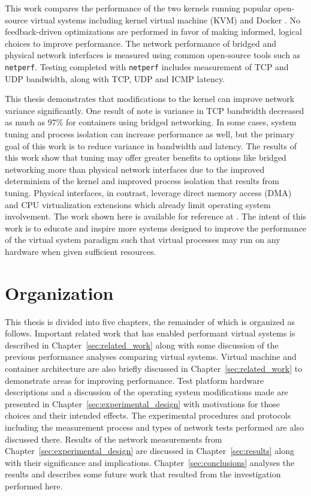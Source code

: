 This work compares the performance of the two kernels running popular open-source virtual systems including kernel virtual machine (KVM) and Docker \autocite{dockerdotcom}.
No feedback-driven optimizations are performed in favor of making informed, logical choices to improve performance.
The network performance of bridged and physical network interfaces is measured using common open-source tools such as \texttt{netperf}.
Testing completed with \texttt{netperf} includes measurement of TCP and UDP bandwidth, along with TCP, UDP and ICMP latency.

This thesis demonstrates that modifications to the kernel can improve network variance significantly.  
One result of note is variance in TCP bandwidth decreased as much as 97\% for containers using bridged networking.
In some cases, system tuning and process isolation can increase performance as well, but the primary goal of this work is to reduce variance in bandwidth and latency.
The results of this work show that tuning may offer greater benefits to options like bridged networking more than physical network interfaces due to the improved determinism of the kernel and improved process isolation that results from tuning.
Physical interfaces, in contrast, leverage direct memory access (DMA) and CPU virtualization extensions which already limit operating system involvement. 
The work shown here is available for reference at .
The intent of this work is to educate and inspire more systems designed to improve the performance of the virtual system paradigm such that virtual processes may run on any hardware when given sufficient resources.  

\section{Organization} %
\label{sec:introorganization}

This thesis is divided into five chapters, the remainder of which is organized as follows.
Important related work that has enabled performant virtual systems is described in Chapter~\ref{sec:related_work} along with some discussion of the previous performance analyses comparing virtual systems.
Virtual machine and container architecture are also briefly discussed in Chapter~\ref{sec:related_work} to demonstrate areas for improving performance.
Test platform hardware descriptions and a discussion of the operating system modifications made are presented in Chapter~\ref{sec:experimental_design} with motivations for those choices and their intended effects.
The experimental procedures and protocols including the measurement process and types of network tests performed are also discussed there.
Results of the network measurements from Chapter~\ref{sec:experimental_design} are discussed in Chapter~\ref{sec:results} along with their significance and implications.  
Chapter~\ref{sec:conclusions} analyses the results and describes some future work that resulted from the investigation performed here.

